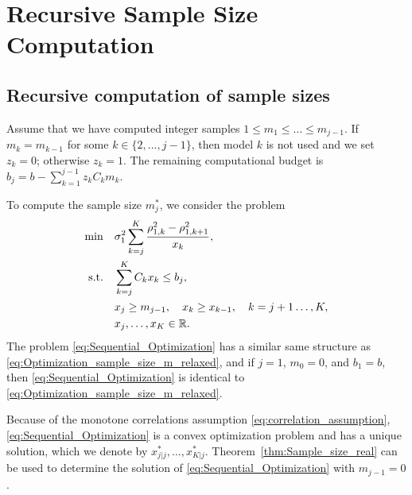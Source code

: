 \section{Recursive Sample Size Computation}\label{sec:MFMC_mk_recursive}
   
\subsection{Recursive computation of sample sizes}   
Assume that we have computed integer samples $1 \le m_1 \le \ldots \le m_{j-1}$.
If $m_k = m_{k-1}$ for some $k \in \{ 2, \ldots, j-1 \}$, then model
$k$ is not used and we set $z_k = 0$; otherwise $z_k = 1$.
The remaining computational budget is $b_j = b -  \sum_{k=1}^{j-1} z_k C_k m_k$.

To compute the sample size $m_j^*$,  we consider the problem 
\begin{subequations}\label{eq:Sequential_Optimization}
    \begin{align}
    \label{eq:Sequential_Optimization_obj}
    \min \quad &\sigma_1^2  \sum_{k=j}^K \frac{ \rho_{1,k}^2 - \rho_{1,k+1}^2}{x_k},   \\
       \text{s.t.}\quad & \sum_{k=j}^K C_k x_k \le b_j,       \\
                                & x_j \ge m_{j-1},\quad  x_k \ge x_{k-1}, \quad k=j+1\ldots,K,\label{eq:Sequential_Optimization_obj_c}\\
                                &x_j,\ldots, x_K\in \mathbb{R}.
    \end{align}
\end{subequations}   
The problem  \eqref{eq:Sequential_Optimization} has a similar same structure as 
\eqref{eq:Optimization_sample_size_m_relaxed}, and 
if $j = 1$, $m_0 = 0$, and $b_1 = b$, then \eqref{eq:Sequential_Optimization} is
identical to \eqref{eq:Optimization_sample_size_m_relaxed}.

Because of the monotone correlations assumption \eqref{eq:correlation_assumption},
\eqref{eq:Sequential_Optimization} is a convex optimization problem and has a unique
solution, which we denote by $x_{j|j}^*, \ldots, x_{K|j}^*$.
Theorem~\ref{thm:Sample_size_real} can be used to determine the solution of
\eqref{eq:Sequential_Optimization} with $m_{j-1} = 0$.


